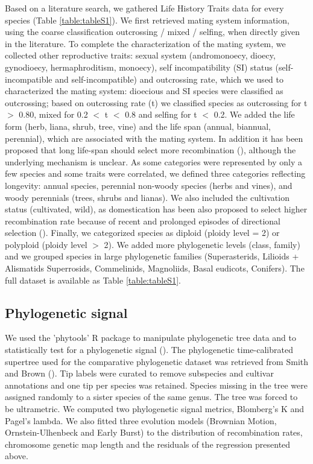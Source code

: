 \documentclass{article}
\begin{document}
 Based on a literature search, we gathered Life History Traits data for every species (Table \ref{table:tableS1}). We first retrieved mating system information, using the coarse classification outcrossing / mixed / selfing, when directly given in the literature. To complete the characterization of the mating system, we collected other reproductive traits: sexual system (andromonoecy, dioecy, gynodioecy, hermaphroditism, monoecy), self incompatibility (SI) status (self-incompatible and self-incompatible) and outcrossing rate, which we used to characterized the mating system: dioecious and SI species were classified as outcrossing; based on outcrossing rate (t) we classified species as outcrossing for t $>$ 0.80, mixed for 0.2 $<$ t $<$ 0.8 and selfing for t $<$ 0.2. We added the life form (herb, liana, shrub, tree, vine) and the life span (annual, biannual, perennial), which are associated with the mating system. In addition it has been proposed that long life-span should select more recombination (\cite{burtMammalianChiasmaFrequencies1987}), although the underlying mechanism is unclear. As some categories were represented by only a few species and some traits were correlated, we defined three categories reflecting longevity: annual species, perennial non-woody species (herbs and vines), and woody perennials (trees, shrubs and lianas). We also included the cultivation status (cultivated, wild), as domestication has been also proposed to select higher recombination rate because of recent and prolonged episodes of directional selection (\cite{ross-ibarraGenomeSizeRecombination2007a,burtMammalianChiasmaFrequencies1987}). Finally, we categorized species as diploid (ploidy level = 2) or polyploid (ploidy level $>$ 2). We added more phylogenetic levels (class, family) and we grouped species in large phylogenetic families (Superasterids, Lilioids + Alismatids Superrosids, Commelinids, Magnoliids, Basal eudicots, Conifers). The full dataset is available as Table \ref{table:tableS1}.

 
\subsection*{Phylogenetic signal}


We used the 'phytools' R package to manipulate phylogenetic tree data and to statistically test for a phylogenetic signal (\cite{revellPhytoolsUpdatedEcosystem2024}). The phylogenetic time-calibrated supertree used for the comparative phylogenetic dataset was retrieved from Smith and Brown (\cite{smithConstructingBroadlyInclusive2018}). Tip labels were curated to remove subspecies and cultivar annotations and one tip per species was retained. Species missing in the tree were assigned randomly to a sister species of the same genus. The tree was forced to be ultrametric. We computed two phylogenetic signal metrics, Blomberg's K and Pagel's lambda. We also fitted three evolution models (Brownian Motion, Ornstein-Ulhenbeck and Early Burst) to the distribution of recombination rates, chromosome genetic map length and the residuals of the regression presented above.
\end{document}
